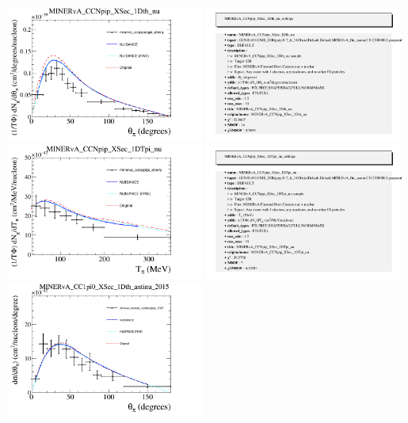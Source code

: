 \documentclass{article}
\begin{document}
\centering
\includegraphics[width=0.49\textwidth]{figures/minerva_ccnpipangle_eberly_comp.png}
\includegraphics[width=0.49\textwidth]{figures/minerva_ccnpipangle_eberly_info.png}
\centering
\includegraphics[width=0.49\textwidth]{figures/minerva_ccnpiptpi_eberly_comp.png}
\includegraphics[width=0.49\textwidth]{figures/minerva_ccnpiptpi_eberly_info.png}
\centering
\includegraphics[width=0.49\textwidth]{figures/minerva_numub_ccpi0anglepi_2015_comp.png}
\end{document}
